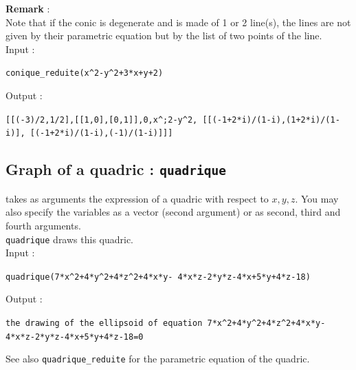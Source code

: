 \documentclass[a4paper,11pt]{book}
\begin{document}
{\bf Remark} :\\
Note that if the conic is degenerate and is made of 1 or 2 line(s), 
the lines are not given by 
their parametric equation but by the list of two points of the line.\\ 
Input :
\begin{center}{\tt conique\_reduite(x\verb|^|2-y\verb|^|2+3*x+y+2)}\end{center}
Output :
\begin{center}{\tt [[(-3)/2,1/2],[[1,0],[0,1]],0,x\verb|^;|2-y\verb|^|2, [[(-1+2*i)/(1-i),(1+2*i)/(1-i)], [(-1+2*i)/(1-i),(-1)/(1-i)]]]}\end{center}

\subsection{Graph of a quadric : {\tt quadrique}}
 takes as arguments the expression of a
quadric with respect to $x,y,z$. You may also specify the variables
as a vector (second argument) or as second, third and fourth arguments.\\ 
{\tt quadrique} draws this quadric.\\
Input :
\begin{center}{\tt quadrique(7*x\verb|^|2+4*y\verb|^|2+4*z\verb|^|2+4*x*y- 4*x*z-2*y*z-4*x+5*y+4*z-18)}\end{center}
Output :
\begin{center}{\tt the drawing of the ellipsoid of equation 7*x\verb|^|2+4*y\verb|^|2+4*z\verb|^|2+4*x*y-4*x*z-2*y*z-4*x+5*y+4*z-18=0}\end{center}
See also {\tt quadrique\_reduite} for
the parametric equation of the quadric.
\end{document}
